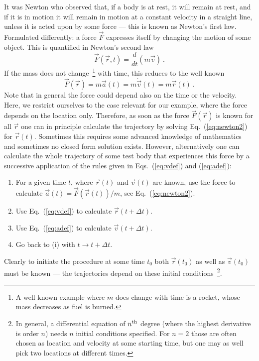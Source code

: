 \documentclass[12pt,ngerman,american]{iopart}
\begin{document}
It was Newton who observed that, if a body is at rest, it will remain at rest, and if it is in motion it will remain in motion at a constant velocity in a straight line, 
unless it is acted upon by some force --- this is known as Newton's first law.
Formulated differently: a force $\vec F$ expresses itself by changing the motion of some object.
This is quantified in Newton's second law
\begin{equation}
\vec F(\vec r, t) = \frac{d}{dt}(m \vec v) \ .
\end{equation}
If the mass does not change~\footnote{%
	A well known example where $m$ does change with time is a rocket, whose mass decreases as fuel is burned.
} with time, this reduces to the well known
\begin{equation}
\vec F(\vec r) = m \vec a(t) = m\dot{\vec v}(t) = m\ddot{\vec{r}}(t) \ . \label{eq:newton2}
\end{equation}
Note that in general the force could depend also on the time or the velocity.
Here, we restrict ourselves to the case relevant for our example, where the force depends on the location only.
Therefore, as soon as the force $\vec F(\vec r)$ is known for all $\vec r$ one can in principle calculate the trajectory by solving Eq.~(\ref{eq:newton2}) for $\vec r(t)$.
Sometimes this requires some advanced knowledge of mathematics and sometimes no closed form solution exists.
However, alternatively one can calculate the whole trajectory of some test body that experiences this force by a successive application of the rules given in Eqs.~(\ref{eq:vdef}) and (\ref{eq:adef}):
\begin{enumerate}
\item For a given time $t$, where $\vec r(t)$ and $\vec v(t)$ are known, use the force to calculate $\vec a(t) = \vec F(\vec r(t)) / m$, see Eq.~(\ref{eq:newton2}).
\item Use Eq.~(\ref{eq:vdef}) to calculate $\vec r(t+\Delta t)$.
\item Use Eq.~(\ref{eq:adef}) to calculate $\vec v(t+\Delta t)$.
\item Go back to (i) with $t\to t+\Delta t$.
\end{enumerate}
Clearly to initiate the procedure at some time $t_0$ both $\vec r(t_0)$ as well as $\vec v(t_0)$ must be known --- the  trajectories depend on these initial conditions~\footnote{%
	In general, a differential equation of $n^{\rm th}$ degree (where the highest derivative is order $n$) needs $n$ initial conditions specified.
	For $n=2$ those are often chosen as location and velocity at some starting time, but one may as well pick two locations at different times.%
}.
\end{document}
